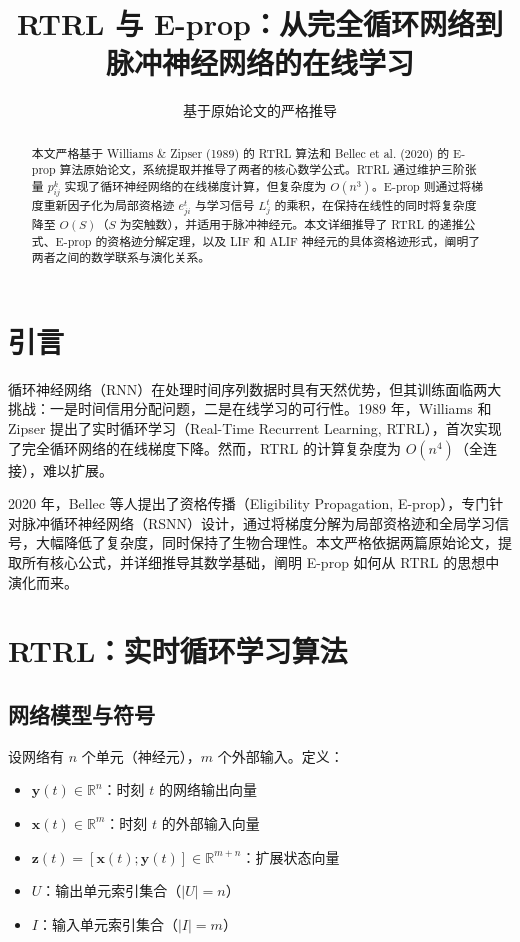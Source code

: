 \documentclass{article}
\title{RTRL 与 E-prop：从完全循环网络到脉冲神经网络的在线学习}
\author{基于原始论文的严格推导}
\date{}
\begin{document}
\maketitle

\begin{abstract}
本文严格基于 Williams \& Zipser (1989) 的 RTRL 算法和 Bellec et al. (2020) 的 E-prop 算法原始论文，系统提取并推导了两者的核心数学公式。RTRL 通过维护三阶张量 $p_{ij}^k$ 实现了循环神经网络的在线梯度计算，但复杂度为 $O(n^3)$。E-prop 则通过将梯度重新因子化为局部资格迹 $e_{ji}^t$ 与学习信号 $L_j^t$ 的乘积，在保持在线性的同时将复杂度降至 $O(S)$（$S$ 为突触数），并适用于脉冲神经元。本文详细推导了 RTRL 的递推公式、E-prop 的资格迹分解定理，以及 LIF 和 ALIF 神经元的具体资格迹形式，阐明了两者之间的数学联系与演化关系。
\end{abstract}

\section{引言}

循环神经网络（RNN）在处理时间序列数据时具有天然优势，但其训练面临两大挑战：一是时间信用分配问题，二是在线学习的可行性。1989 年，Williams 和 Zipser 提出了实时循环学习（Real-Time Recurrent Learning, RTRL），首次实现了完全循环网络的在线梯度下降。然而，RTRL 的计算复杂度为 $O(n^4)$（全连接），难以扩展。

2020 年，Bellec 等人提出了资格传播（Eligibility Propagation, E-prop），专门针对脉冲循环神经网络（RSNN）设计，通过将梯度分解为局部资格迹和全局学习信号，大幅降低了复杂度，同时保持了生物合理性。本文严格依据两篇原始论文，提取所有核心公式，并详细推导其数学基础，阐明 E-prop 如何从 RTRL 的思想中演化而来。

\section{RTRL：实时循环学习算法}

\subsection{网络模型与符号}

设网络有 $n$ 个单元（神经元），$m$ 个外部输入。定义：
\begin{itemize}
    \item $\mathbf{y}(t) \in \mathbb{R}^n$：时刻 $t$ 的网络输出向量
    \item $\mathbf{x}(t) \in \mathbb{R}^m$：时刻 $t$ 的外部输入向量
    \item $\mathbf{z}(t) = [\mathbf{x}(t); \mathbf{y}(t)] \in \mathbb{R}^{m+n}$：扩展状态向量
    \item $U$：输出单元索引集合（$|U|=n$）
    \item $I$：输入单元索引集合（$|I|=m$）
\end{itemize}
\end{document}

